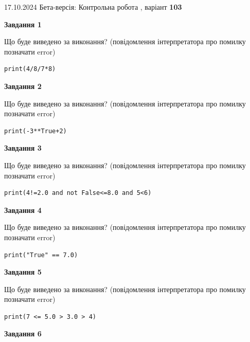 \documentclass[12pt, ukrainian]{article}
\begin{document}
{\Large{17.10.2024 Бета-версія: Контрольна робота , варіант  \No \textbf { 103 }\par}}
{
\begin {large}
{\begin {center}\textbf{Завдання 1}\end {center}}

Що буде виведено за виконання? (повідомлення інтерпретатора про помилку позначати error)\par
\begin{verbatim}
print(4/8/7*8)
\end{verbatim}

{\begin {center}\textbf{Завдання 2}\end {center}}

Що буде виведено за виконання? (повідомлення інтерпретатора про помилку позначати error)\par
\begin{verbatim}
print(-3**True+2)
\end{verbatim}

{\begin {center}\textbf{Завдання 3}\end {center}}

Що буде виведено за виконання? (повідомлення інтерпретатора про помилку позначати error)\par
\begin{verbatim}
print(4!=2.0 and not False<=8.0 and 5<6)
\end{verbatim}

{\begin {center}\textbf{Завдання 4}\end {center}}

Що буде виведено за виконання? (повідомлення інтерпретатора про помилку позначати error)\par
\begin{verbatim}
print("True" == 7.0)
\end{verbatim}

{\begin {center}\textbf{Завдання 5}\end {center}}

Що буде виведено за виконання? (повідомлення інтерпретатора про помилку позначати error)\par
\begin{verbatim}
print(7 <= 5.0 > 3.0 > 4)
\end{verbatim}

{\begin {center}\textbf{Завдання 6}\end {center}}


\end{large}}
\end{document}
